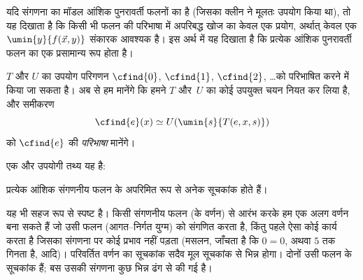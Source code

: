 \documentclass[../../../include/open-logic-section]{subfiles}
\begin{document}
यदि संगणना का मॉडल आंशिक पुनरावर्ती फलनों का है (जिसका क्लीन ने मूलतः
उपयोग किया था), तो यह दिखाता है कि किसी भी फलन की परिभाषा में अपरिबद्ध
खोज का केवल एक प्रयोग, अर्थात् केवल एक $\umin{y}{f(\vec x, y)}$ संकारक
आवश्यक है। इस अर्थ में यह दिखाता है कि प्रत्येक आंशिक पुनरावर्ती फलन का
एक प्रसामान्य रूप होता है।

$T$ और $U$ का उपयोग परिगणन $\cfind{0}$, $\cfind{1}$, $\cfind{2}$,
\dots को परिभाषित करने में किया जा सकता है। अब से हम मानेंगे कि हमने
$T$ और~$U$ का कोई उपयुक्त चयन नियत कर लिया है, और समीकरण
\[
\cfind{e}(x) \simeq U(\umin{s}{T(e,x,s)})
\]
को $\cfind{e}$ की \emph{परिभाषा} मानेंगे।

एक और उपयोगी तथ्य यह है:

\begin{thm}
प्रत्येक आंशिक संगणनीय फलन के अपरिमित रूप से अनेक सूचकांक होते हैं।
\end{thm}

यह भी सहज रूप से स्पष्ट है। किसी संगणनीय फलन (के वर्णन) से आरंभ करके
हम एक अलग वर्णन बना सकते हैं जो उसी फलन (आगत–निर्गत युग्म) को संगणित
करता है, किंतु पहले ऐसा कोई कार्य करता है जिसका संगणना पर कोई प्रभाव
नहीं पड़ता (मसलन, जाँचता है कि $0 = 0$, अथवा $5$ तक गिनता है, आदि)।
परिवर्तित वर्णन का सूचकांक सदैव मूल सूचकांक से भिन्न होगा। दोनों उसी फलन
के सूचकांक हैं; बस उसकी संगणना कुछ भिन्न ढंग से की गई है।
\end{document}
